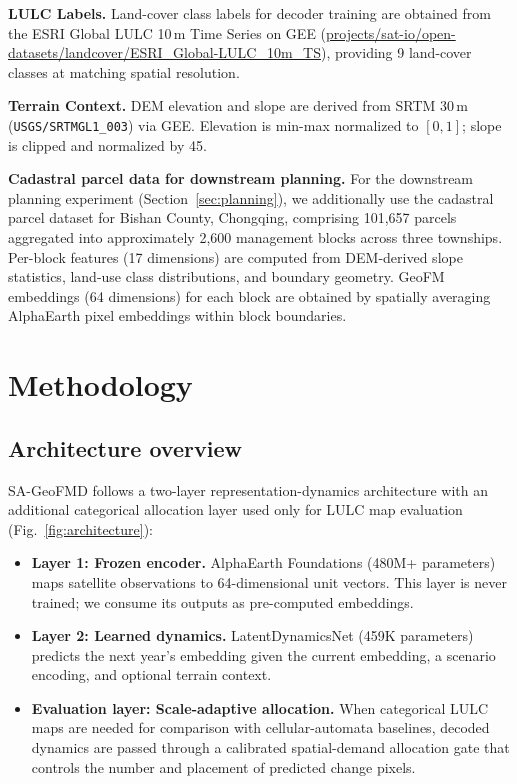 \documentclass{article}
\begin{document}
\textbf{LULC Labels.} Land-cover class labels for decoder training are obtained from the ESRI Global LULC 10\,m Time Series on GEE (\url{projects/sat-io/open-datasets/landcover/ESRI_Global-LULC_10m_TS}), providing 9 land-cover classes at matching spatial resolution.

\textbf{Terrain Context.} DEM elevation and slope are derived from SRTM 30\,m (\texttt{USGS/SRTMGL1\_003}) via GEE. Elevation is min-max normalized to $[0,1]$; slope is clipped and normalized by 45\textdegree.

\textbf{Cadastral parcel data for downstream planning.} For the downstream planning experiment (Section~\ref{sec:planning}), we additionally use the cadastral parcel dataset for Bishan County, Chongqing, comprising 101{,}657 parcels aggregated into approximately 2{,}600 management blocks across three townships. Per-block features (17 dimensions) are computed from DEM-derived slope statistics, land-use class distributions, and boundary geometry. GeoFM embeddings (64 dimensions) for each block are obtained by spatially averaging AlphaEarth pixel embeddings within block boundaries.


\section{Methodology}
\label{sec:method}

\subsection{Architecture overview}

SA-GeoFMD follows a two-layer representation-dynamics architecture with an additional categorical allocation layer used only for LULC map evaluation (Fig.~\ref{fig:architecture}):

\begin{itemize}
\item \textbf{Layer 1: Frozen encoder.} AlphaEarth Foundations (480M+ parameters) maps satellite observations to 64-dimensional unit vectors. This layer is never trained; we consume its outputs as pre-computed embeddings.
\item \textbf{Layer 2: Learned dynamics.} LatentDynamicsNet (459K parameters) predicts the next year's embedding given the current embedding, a scenario encoding, and optional terrain context.
\item \textbf{Evaluation layer: Scale-adaptive allocation.} When categorical LULC maps are needed for comparison with cellular-automata baselines, decoded dynamics are passed through a calibrated spatial-demand allocation gate that controls the number and placement of predicted change pixels.
\end{itemize}
\end{document}
